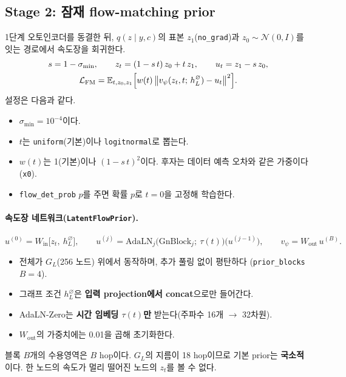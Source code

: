 \documentclass[11pt]{article}
\newcommand{\E}{\mathbb{E}}
\newcommand{\N}{\mathcal{N}}
\newcommand{\code}[1]{\texttt{#1}}
\begin{document}
\subsection{Stage 2: 잠재 flow-matching prior}\label{sec:chi-prior}

1단계 오토인코더를 동결한 뒤, $q(z\mid y,c)$의 표본 $z_1$(\code{no\_grad})과
$z_0\sim\N(0,I)$를 잇는 경로에서 속도장을 회귀한다.
\begin{gather}
  s = 1-\sigma_{\min},\qquad
  z_t = (1 - s\,t)\,z_0 + t\,z_1,\qquad
  u_t = z_1 - s\,z_0,\nonumber\\
  \mathcal{L}_{\text{FM}} = \E_{t,z_0,z_1}\Bigl[w(t)\,\bigl\|v_\psi(z_t, t;\,h_L^{\varnothing}) - u_t\bigr\|^2\Bigr].
  \label{eq:fm}
\end{gather}
설정은 다음과 같다.
\begin{itemize}
\item $\sigma_{\min}=10^{-4}$이다.
\item $t$는 \code{uniform}(기본)이나 \code{logitnormal}로 뽑는다.
\item $w(t)$는 1(기본)이나 $(1-s\,t)^2$이다. 후자는 데이터 예측 오차와 같은
  가중이다(\code{x0}).
\item \code{flow\_det\_prob} $p$를 주면 확률 $p$로 $t=0$을 고정해 학습한다.
\end{itemize}

\paragraph{속도장 네트워크(\code{LatentFlowPrior}).}
\begin{equation}
  u^{(0)} = W_{\text{in}}\bigl[z_t,\ h_L^{\varnothing}\bigr],\qquad
  u^{(j)} = \mathrm{AdaLN}_j\bigl(\mathrm{GnBlock}_j;\ \tau(t)\bigr)\bigl(u^{(j-1)}\bigr),\qquad
  v_\psi = W_{\text{out}}\,u^{(B)}.
\end{equation}
\begin{itemize}
\item 전체가 $G_L$(256 노드) 위에서 동작하며, 추가 풀링 없이 평탄하다
  (\code{prior\_blocks} $B=4$).
\item 그래프 조건 $h_L^{\varnothing}$은 \textbf{입력 projection에서 concat}으로만
  들어간다.
\item AdaLN-Zero는 \textbf{시간 임베딩 $\tau(t)$만} 받는다(주파수 16개
  $\to$ 32차원).
\item $W_{\text{out}}$의 가중치에는 0.01을 곱해 초기화한다.
\end{itemize}
블록 $B$개의 수용영역은 $B$ hop이다. $G_L$의 지름이 18 hop이므로 기본
prior는 \textbf{국소적}이다. 한 노드의 속도가 멀리 떨어진 노드의 $z_t$를 볼
수 없다.
\end{document}
